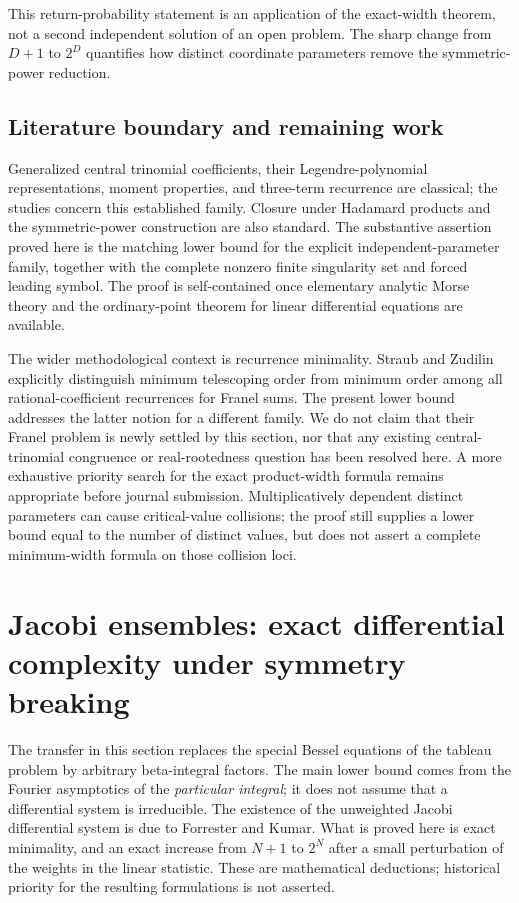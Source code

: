 \documentclass[11pt,a4paper]{article}
\theoremstyle{definition}
\theoremstyle{remark}
\numberwithin{equation}{section}
\begin{document}
This return-probability statement is an application of the exact-width
theorem, not a second independent solution of an open problem.  The sharp
change from $D+1$ to $2^D$ quantifies how distinct coordinate parameters
remove the symmetric-power reduction.

\subsection{Literature boundary and remaining work}

Generalized central trinomial coefficients, their Legendre-polynomial
representations, moment properties, and three-term recurrence are classical;
the studies \cite{p1:Noe2006transfer,p1:LWW2023transfer} concern this established
family.  Closure under Hadamard products and the symmetric-power construction
are also standard.  The substantive assertion proved here is the matching
lower bound for the explicit independent-parameter family, together with
the complete nonzero finite singularity set and forced leading symbol.
The proof is self-contained once elementary analytic Morse theory and the
ordinary-point theorem for linear differential equations are available.

The wider methodological context is recurrence minimality.  Straub and
Zudilin \cite{p8:AC_SZ} explicitly distinguish minimum telescoping
order from minimum order among all rational-coefficient recurrences for
Franel sums.  The present lower bound addresses the latter notion for
a different family.  We do not claim that their Franel problem is newly
settled by this section, nor that any existing central-trinomial congruence
or real-rootedness question has been resolved here.  A more exhaustive
priority search for the exact product-width formula remains appropriate
before journal submission.  Multiplicatively dependent distinct parameters
can cause critical-value collisions; the proof still supplies a lower
bound equal to the number of distinct values, but does not assert a
complete minimum-width formula on those collision loci.


\section{Jacobi ensembles: exact differential complexity under symmetry breaking}
\label{p1:sec:jacobi-transfer}

The transfer in this section replaces the special Bessel equations of the
tableau problem by arbitrary beta-integral factors.  The main lower bound
comes from the Fourier asymptotics of the \emph{particular integral}; it
does not assume that a differential system is irreducible.  The existence
of the unweighted Jacobi differential system is due to Forrester and
Kumar.  What is proved here is exact minimality, and an exact increase
from $N+1$ to $2^N$ after a small perturbation of the weights in the linear
statistic.  These are mathematical deductions; historical priority for
the resulting formulations is not asserted.
\end{document}
